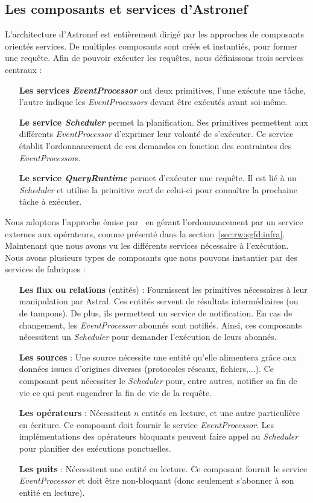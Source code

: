 \subsection{Les composants et services d'Astronef}
L'architecture d'Astronef est entièrement dirigé par les approches de composants orientés services. De multiples composants sont créés et instantiés, pour former une requête. Afin de pouvoir exécuter les requêtes, nous définissons trois services centraux :
\begin{itemize}
	\item[\textbf{Les services \textit{EventProcessor}}] ont deux primitives, l'une exécute une tâche, l'autre indique les \textit{EventProcessors} devant être exécutés avant soi-même.
	\item[\textbf{Le service \textit{Scheduler}}] permet la planification. Ses primitives permettent aux différents \textit{EventProcessor} d'exprimer leur volonté de s'exécuter. Ce service établit l'ordonnancement de ces demandes en fonction des contraintes des \textit{EventProcessor}s.
	\item[\textbf{Le service \textit{QueryRuntime}}] permet d'exécuter une requête. Il est lié à un \textit{Scheduler} et utilise la primitive \textit{next} de celui-ci pour connaître la prochaine tâche à exécuter.
\end{itemize}

Nous adoptons l'approche émise par~\cite{Carney:scheduling} en gérant l'ordonnancement par un service externes aux opérateurs, comme présenté dans la section~\ref{sec:rw:sgfd:infra}. Maintenant que nous avons vu les différents services nécessaire à l'exécution. Nous avons plusieurs types de composants que nous pouvons instantier par des services de fabriques :
\begin{itemize}
	\item[\textbf{Les flux ou relations} (entités)] : Fournissent les primitives nécessaires à leur manipulation par Astral. Ces entités servent de résultats intermédiaires (ou de tampons). De plus, ils permettent un service de notification. En cas de changement, les \textit{EventProcessor} abonnés sont notifiés. Ainsi, ces composants nécessitent un \textit{Scheduler} pour demander l'exécution de leurs abonnés.
	\item[\textbf{Les sources}] : Une source nécessite une entité qu'elle alimentera grâce aux données issues d'origines diverses (protocoles réseaux, fichiers,...). Ce composant peut nécessiter le \textit{Scheduler} pour, entre autres, notifier sa fin de vie ce qui peut engendrer la fin de vie de la requête.
	\item[\textbf{Les opérateurs}] : Nécessitent $n$ entités en lecture, et une autre particulière en écriture. Ce composant doit fournir le service \textit{EventProcessor}. Les implémentations des opérateurs bloquants peuvent faire appel au \textit{Scheduler} pour planifier des exécutions ponctuelles.
	\item[\textbf{Les puits}] : Nécessitent une entité en lecture. Ce composant fournit le service \textit{EventProcessor} et doit être non-bloquant (donc seulement s'abonner à son entité en lecture).
\end{itemize}

